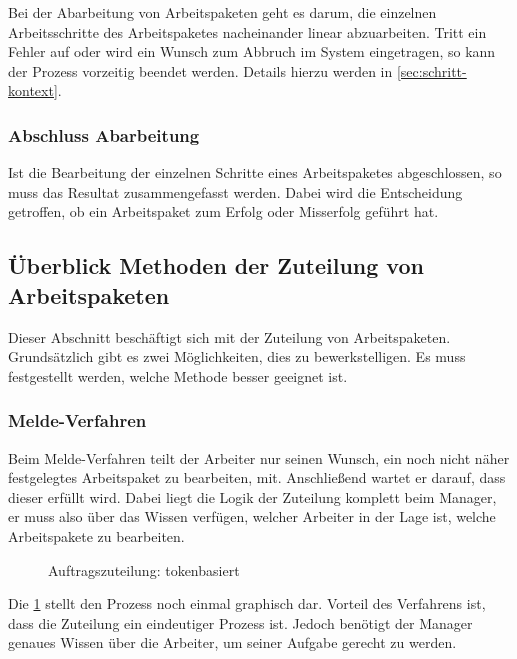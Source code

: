 Bei der Abarbeitung von Arbeitspaketen geht es darum,
die einzelnen Arbeitsschritte des Arbeitspaketes nacheinander linear abzuarbeiten.
Tritt ein Fehler auf oder wird ein Wunsch zum Abbruch im System eingetragen,
so kann der Prozess vorzeitig beendet werden. Details hierzu werden in \cref{sec:schritt-kontext}.

\subsubsection{Abschluss Abarbeitung}

Ist die Bearbeitung der einzelnen Schritte eines Arbeitspaketes abgeschlossen,
so muss das Resultat zusammengefasst werden. 
Dabei wird die Entscheidung getroffen,
ob ein Arbeitspaket zum Erfolg oder Misserfolg geführt hat.

\subsection{Überblick Methoden der Zuteilung von Arbeitspaketen}
\label{sec:methoden:zuteilung}

Dieser Abschnitt beschäftigt sich mit der Zuteilung von Arbeitspaketen.
Grundsätzlich gibt es zwei Möglichkeiten, dies zu bewerkstelligen.
Es muss festgestellt werden, welche Methode besser geeignet ist.

\subsubsection{Melde-Verfahren}
Beim Melde-Verfahren teilt der Arbeiter nur seinen Wunsch, ein noch nicht näher festgelegtes Arbeitspaket zu bearbeiten, mit.
Anschließend wartet er darauf, dass dieser erfüllt wird.
Dabei liegt die Logik der Zuteilung komplett beim Manager,
er muss also über das Wissen verfügen,
welcher Arbeiter in der Lage ist, welche Arbeitspakete zu bearbeiten.

\begin{figure}[ht] 
    \centering
  \begin{sequencediagram}
  \end{sequencediagram}
  \caption{Auftragszuteilung: tokenbasiert}
  \label{fig:auftrag-zuteilung-token}
\end{figure}

Die \cref{fig:auftrag-zuteilung-token} stellt den Prozess noch einmal graphisch dar.
Vorteil des Verfahrens ist, dass die Zuteilung ein eindeutiger Prozess ist.
Jedoch benötigt der Manager genaues Wissen über die Arbeiter,
um seiner Aufgabe gerecht zu werden.

